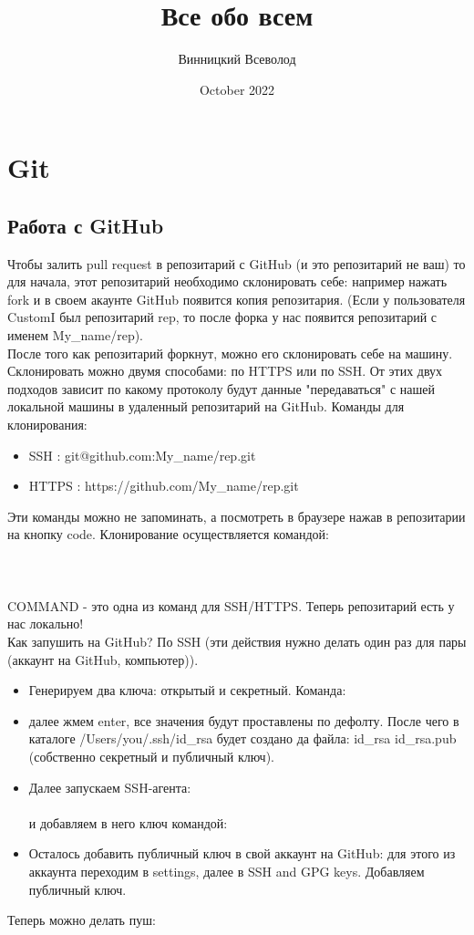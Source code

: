 \documentclass{article}
\title{Все обо всем}
\author{Винницкий Всеволод}
\date{October 2022}
\begin{document}
\maketitle

\section{Git}
\subsection{Работа с GitHub}
Чтобы залить pull request в репозитарий с GitHub (и это репозитарий не ваш) то для начала, этот репозитарий необходимо склонировать себе: например нажать fork и в своем акаунте GitHub появится копия репозитария. (Если у пользователя CustomI был репозитарий rep, то после форка у нас появится репозитарий с именем My\_name/rep). \\
После того как репозитарий форкнут, можно его склонировать себе на машину. Склонировать можно двумя способами: по HTTPS или по SSH. От этих двух подходов зависит по какому протоколу будут данные "передаваться" с нашей локальной машины в удаленный репозитарий на GitHub.
Команды для клонирования:
\begin{itemize}
\item SSH : git@github.com:My\_name/rep.git
\item HTTPS : https://github.com/My\_name/rep.git
\end{itemize}

Эти команды можно не запоминать, а посмотреть в браузере нажав в репозитарии на кнопку code. Клонирование осуществляется командой:
\\
\\
\\
\\
COMMAND - это одна из команд для SSH/HTTPS. Теперь репозитарий есть у нас локально!
\\
Как запушить на GitHub?
По SSH (эти действия нужно делать один раз для пары (аккаунт на GitHub, компьютер)). 

\begin{itemize}
\item Генерируем два ключа: открытый и секретный. Команда:
\\
\item далее жмем enter, все значения будут проставлены по дефолту. После чего в каталоге /Users/you/.ssh/id\_rsa будет создано да файла: id\_rsa id\_rsa.pub (собственно секретный и публичный ключ).

\item Далее запускаем SSH-агента:
\\
\\
и добавляем в него ключ командой:
\\
\item Осталось добавить публичный ключ в свой аккаунт на GitHub: для этого из аккаунта переходим в settings, далее в SSH and GPG keys. Добавляем публичный ключ.
\end{itemize}

Теперь можно делать пуш: 
\end{document}
